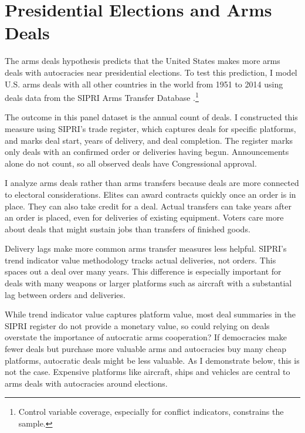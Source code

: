 \documentclass[12pt]{article}
\begin{document}
\section{Presidential Elections and Arms Deals}


The arms deals hypothesis predicts that the United States makes more arms deals with autocracies near presidential elections.
To test this prediction, I model U.S. arms deals with all other countries in the world from 1951 to 2014 using deals data from the SIPRI Arms Transfer Database \citep{SIPRI2021}.\footnote{Control variable coverage, especially for conflict indicators, constrains the sample.}


The outcome in this panel dataset is the annual count of deals.
I constructed this measure using SIPRI's trade register, which captures deals for specific platforms, and marks deal start, years of delivery, and deal completion.
The register marks only deals with an confirmed order or deliveries having begun. 
Announcements alone do not count, so all observed deals have Congressional approval.


I analyze arms deals rather than arms transfers because deals are more connected to electoral considerations.
Elites can award contracts quickly once an order is in place.
They can also take credit for a deal. 
Actual transfers can take years after an order is placed, even for deliveries of existing equipment. 
Voters care more about deals that might sustain jobs than transfers of finished goods. 


Delivery lags make more common arms transfer measures less helpful.
SIPRI's trend indicator value methodology tracks actual deliveries, not orders.
This spaces out a deal over many years. 
This difference is especially important for deals with many weapons or larger platforms such as aircraft with a substantial lag between orders and deliveries. 


While trend indicator value captures platform value, most deal summaries in the SIPRI register do not provide a monetary value, so could relying on deals overstate the importance of autocratic arms cooperation? 
If democracies make fewer deals but purchase more valuable arms and autocracies buy many cheap platforms, autocratic deals might be less valuable. 
As I demonstrate below, this is not the case. 
Expensive platforms like aircraft, ships and vehicles are central to arms deals with autocracies around elections. 
\end{document}
